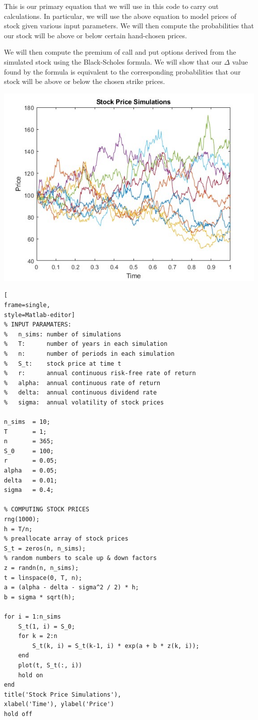 \documentclass[letterpaper,12pt]{article}
\begin{document}
This is our primary equation that we will use in this code to carry out calculations. 
In particular, we will use the above equation to model prices of stock given 
various input parameters. We will then compute the probabilities that our stock 
will be above or below certain hand-chosen prices. 

We will then compute the premium of call and put options derived from the 
simulated stock using the Black-Scholes formula. We will show that our $\Delta$ 
value found by the formula is equivalent to the corresponding probabilities 
that our stock will be above or below the chosen strike prices.

\includegraphics[scale=0.8]{stock_sims}
\begin{lstlisting}[
frame=single,
style=Matlab-editor]
% INPUT PARAMATERS:
%   n_sims: number of simulations
%   T:      number of years in each simulation
%   n:      number of periods in each simulation
%   S_t:    stock price at time t
%   r:      annual continuous risk-free rate of return
%   alpha:  annual continuous rate of return
%   delta:  annual continuous dividend rate
%   sigma:  annual volatility of stock prices

n_sims  = 10;
T       = 1;
n       = 365;
S_0     = 100;
r       = 0.05;
alpha   = 0.05;
delta   = 0.01;
sigma   = 0.4;

% COMPUTING STOCK PRICES
rng(1000);
h = T/n;
% preallocate array of stock prices
S_t = zeros(n, n_sims);
% random numbers to scale up & down factors
z = randn(n, n_sims);
t = linspace(0, T, n);
a = (alpha - delta - sigma^2 / 2) * h;
b = sigma * sqrt(h);

for i = 1:n_sims
    S_t(1, i) = S_0;
    for k = 2:n
        S_t(k, i) = S_t(k-1, i) * exp(a + b * z(k, i));
    end
    plot(t, S_t(:, i))
    hold on
end
title('Stock Price Simulations'), 
xlabel('Time'), ylabel('Price')
hold off
\end{lstlisting}
\end{document}
